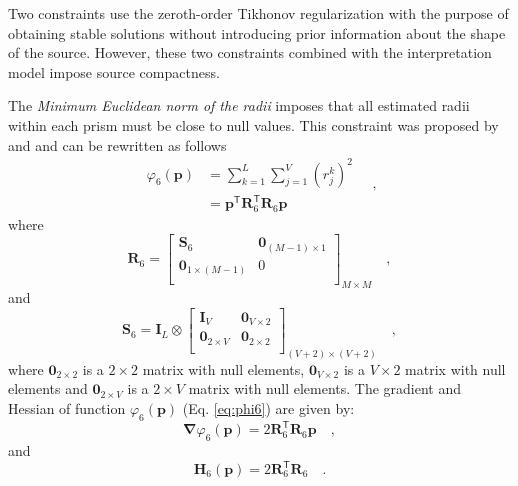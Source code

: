 Two constraints use the zeroth-order Tikhonov regularization with the purpose of obtaining stable solutions without introducing prior information about the shape of the source. 
However, these two constraints combined with the interpretation model impose 
source compactness. 

The \textit{Minimum Euclidean norm of the radii} imposes that 
all estimated radii within each prism must be close to null values. This constraint was proposed by \cite{oliveirajr-etal2011} and \cite{oliveirajr-barbosa2013} and can be rewritten as follows
\begin{equation}\label{eq:phi6}
\begin{split}
\varphi_{6}(\mathbf{p}) &= \sum\limits^{L}_{k=1}\sum\limits^{V}_{j=1}\left(r_{j}^{k}\right)^2 \\
&= \mathbf{p}^{\mathsf{T}} \mathbf{R}_{6}^{\mathsf{T}} \mathbf{R}_{6} \mathbf{p}
\end{split} \quad ,
\end{equation}
where
\begin{equation}
\mathbf{R}_{6} = 
\begin{bmatrix}
\mathbf{S}_{6} & \mathbf{0}_{(M-1) \times 1} \\
\mathbf{0}_{1 \times (M-1)} & 0 \\
\end{bmatrix}_{M\times M} \quad ,
\label{eq:R6-matrix}
\end{equation}
and 
\begin{equation}
\mathbf{S}_{6} = 
\mathbf{I}_{L} \otimes 
\begin{bmatrix}
\mathbf{I}_{V}      & \mathbf{0}_{V \times 2} \\
\mathbf{0}_{2 \times V} & \mathbf{0}_{2 \times 2} \\
\end{bmatrix}_{(V+2) \times (V+2)} \quad ,
\label{eq:S6-matrix}
\end{equation}
where $\mathbf{0}_{2 \times 2}$ is a $2 \times 2$ matrix with null elements,
$\mathbf{0}_{V \times 2}$ is a $V \times 2$ matrix with null elements and
$\mathbf{0}_{2 \times V}$ is a $2 \times V$ matrix with null elements.
The gradient and Hessian of function $\varphi_{6}(\mathbf{p})$ (Eq. \ref{eq:phi6}) are given by:
\begin{equation}\label{eq:phi6_grad}
\boldsymbol{\nabla}\varphi_{6}(\mathbf{p}) = 2 \mathbf{R}_{6}^{\mathsf{T}} \mathbf{R}_{6} \mathbf{p} \quad ,
\end{equation}
and
\begin{equation}\label{eq:phi6_hessian}
\mathbf{H}_{6}(\mathbf{p}) = 2 \mathbf{R}^{\mathsf{T}}_{6}\mathbf{R}_{6} \quad .
\end{equation}


